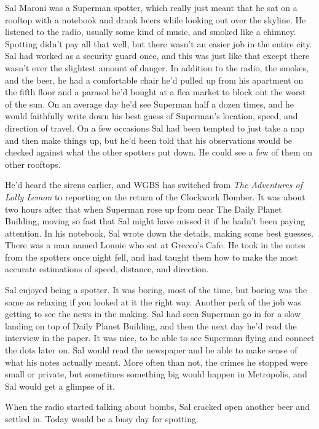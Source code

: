 Sal Maroni was a Superman spotter, which really just meant that he sat
on a rooftop with a notebook and drank beers while looking out over the
skyline. He listened to the radio, usually some kind of music, and
smoked like a chimney. Spotting didn't pay all that well, but there
wasn't an easier job in the entire city. Sal had worked as a security
guard once, and this was just like that except there wasn't ever the
slightest amount of danger. In addition to the radio, the smokes, and
the beer, he had a comfortable chair he'd pulled up from his apartment
on the fifth floor and a parasol he'd bought at a flea market to block
out the worst of the sun. On an average day he'd see Superman half a
dozen times, and he would faithfully write down his best guess of
Superman's location, speed, and direction of travel. On a few occasions
Sal had been tempted to just take a nap and then make things up, but
he'd been told that his observations would be checked against what the
other spotters put down. He could see a few of them on other rooftops.

He'd heard the sirens earlier, and WGBS has switched from \emph{The
Adventures of Lolly Lemon} to reporting on the return of the Clockwork
Bomber. It was about two hours after that when Superman rose up from
near The Daily Planet Building, moving so fast that Sal might have
missed it if he hadn't been paying attention. In his notebook, Sal wrote
down the details, making some best guesses. There was a man named Lonnie
who sat at Grecco's Cafe. He took in the notes from the spotters once
night fell, and had taught them how to make the most accurate
estimations of speed, distance, and direction.

Sal enjoyed being a spotter. It was boring, most of the time, but boring
was the same as relaxing if you looked at it the right way. Another perk
of the job was getting to see the news in the making. Sal had seen
Superman go in for a slow landing on top of Daily Planet Building, and
then the next day he'd read the interview in the paper. It was nice, to
be able to see Superman flying and connect the dots later on. Sal would
read the newspaper and be able to make sense of what his notes actually
meant. More often than not, the crimes he stopped were small or private,
but sometimes something big would happen in Metropolis, and Sal would
get a glimpse of it.

When the radio started talking about bombs, Sal cracked open another
beer and settled in. Today would be a busy day for spotting.

